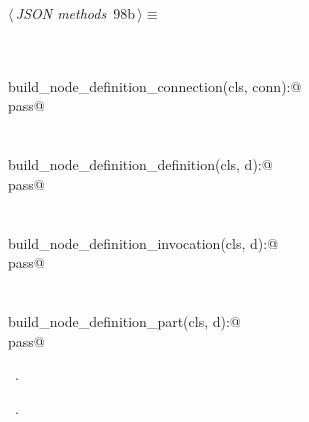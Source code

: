 \documentclass[
    a4paper,      %
    10pt,         %
    openright,    %
    notitlepage,  %
    parskip=half, %
]{scrreprt}       %
\theoremstyle{definition}                    %
\begin{document}
\begin{flushleft} \small
\begin{minipage}{\linewidth}\label{scrap163}\raggedright\small
{} $\langle\,${\itshape JSON methods}\nobreak\ {\footnotesize {98b}}$\,\rangle\equiv$
\vspace{-1exm}
\begin{list}{}{} \item
\mbox{}\lstinline@@\\
\mbox{}\lstinline@classmethod@\\
\mbox{}\lstinline@def build_node_definition_connection(cls, conn):@\\
\mbox{}\lstinline@    pass@\\
\mbox{}\lstinline@@\\
\mbox{}\lstinline@classmethod@\\
\mbox{}\lstinline@def build_node_definition_definition(cls, d):@\\
\mbox{}\lstinline@    pass@\\
\mbox{}\lstinline@@\\
\mbox{}\lstinline@classmethod@\\
\mbox{}\lstinline@def build_node_definition_invocation(cls, d):@\\
\mbox{}\lstinline@    pass@\\
\mbox{}\lstinline@@\\
\mbox{}\lstinline@classmethod@\\
\mbox{}\lstinline@def build_node_definition_part(cls, d):@\\
\mbox{}\lstinline@    pass@\\
\mbox{}\lstinline@@{\NWsep}
\end{list}
\vspace{-1.5ex}
\footnotesize
\begin{list}{}{\setlength{\itemsep}{-\parsep}\setlength{\itemindent}{-\leftmargin}}
\item \NWtxtMacroDefBy\ .
\item \NWtxtMacroRefIn\ .

\item{}
\end{list}
\end{minipage}\vspace{4ex}
\end{flushleft}
\end{document}
